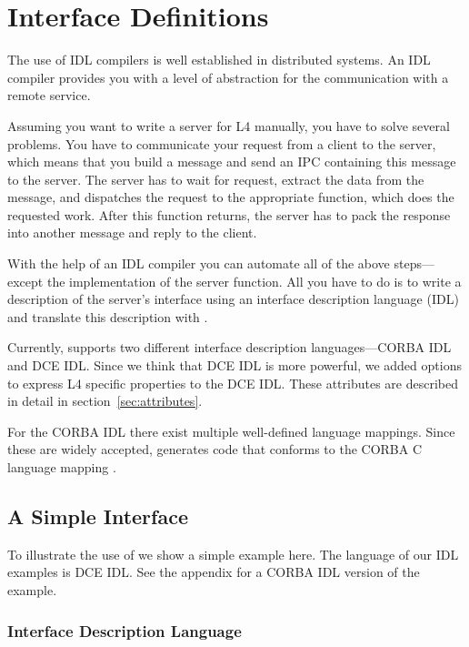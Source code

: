 \chapter{Interface Definitions}
\label{section1}

The use of IDL compilers is well established in distributed systems. An IDL
compiler provides you with a level of abstraction for the communication with a
remote service.

Assuming you want to write a server for L4 manually, you have to solve several
problems. You have to communicate your request from a client to the server,
which means that you build a message and send an IPC containing this message
to the server. The server has to wait for request, extract the data from the
message, and dispatches the request to the appropriate function, which does
the requested work. After this function returns, the server has to pack the
response into another message and reply to the client.

With the help of an IDL compiler you can automate all of the above
steps---except the implementation of the server function. All you have to do
is to write a description of the server's interface using an interface
description language (IDL) and translate this description with \dice{}.

Currently, \dice{} supports two different interface description
languages---CORBA IDL and DCE IDL. Since we think that DCE IDL is more
powerful, we added options to express L4 specific properties to the DCE IDL.
These attributes are described in detail in section~\ref{sec:attributes}.

For the CORBA IDL there exist multiple well-defined language mappings. Since
these are widely accepted, \dice{} generates code that conforms to the CORBA C
language mapping \cite{corba-clm}.

\section{A Simple Interface}

To illustrate the use of \dice{} we show a simple example here. The language
of our IDL examples is DCE IDL. See the appendix for a CORBA IDL version of
the example.

\subsection{Interface Description Language}

